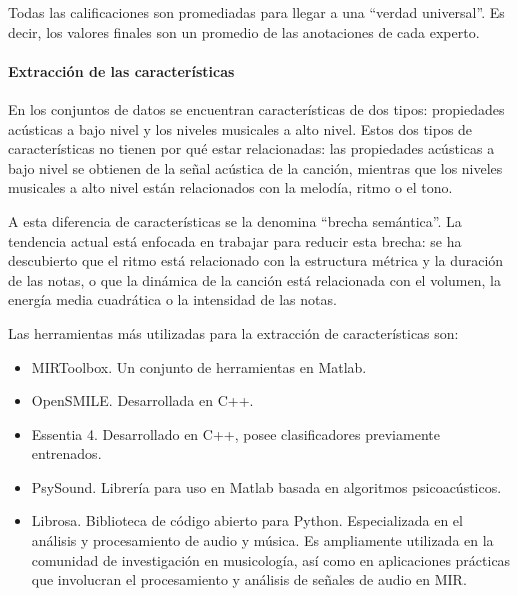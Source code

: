 \documentclass[12pt,a4paper]{article}
\begin{document}
Todas las calificaciones son promediadas para llegar a una ``verdad universal''. Es decir, los valores finales son un promedio de las anotaciones de cada experto.

\paragraph{Extracción de las características}
En los conjuntos de datos se encuentran características de dos tipos: propiedades acústicas a bajo nivel y los niveles musicales a alto nivel. Estos dos tipos de características no tienen por qué estar relacionadas: las propiedades acústicas a bajo nivel se obtienen de la señal acústica de la canción, mientras que los niveles musicales a alto nivel están relacionados con la melodía, ritmo o el tono.


A esta diferencia de características se la denomina ``brecha semántica''. La tendencia actual está enfocada en trabajar para reducir esta brecha: se ha descubierto que el ritmo está relacionado con la estructura métrica y la duración de las notas, o que la dinámica de la canción está relacionada con el volumen, la energía media cuadrática o la intensidad de las notas.


Las herramientas más utilizadas para la extracción de características son:
\begin{itemize}
	\item MIRToolbox. Un conjunto de herramientas en Matlab.
	\item OpenSMILE. Desarrollada en C++.
	\item Essentia 4. Desarrollado en C++, posee clasificadores previamente entrenados.
	\item PsySound. Librería para uso en Matlab basada en algoritmos psicoacústicos.
	\item Librosa. Biblioteca de código abierto para Python. Especializada en el análisis y procesamiento de audio y música. Es ampliamente utilizada en la comunidad de investigación en musicología, así como en aplicaciones prácticas que involucran el procesamiento y análisis de señales de audio en MIR.
\end{itemize}
\end{document}
